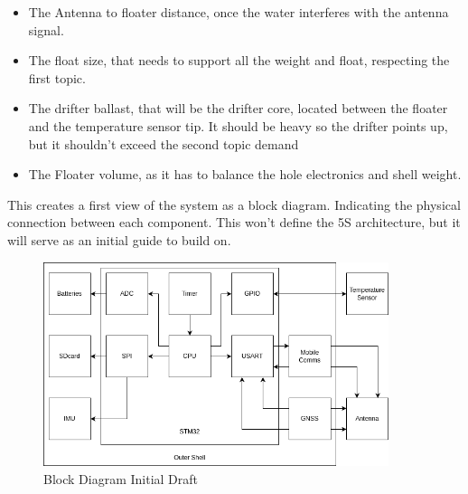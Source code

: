 \begin{itemize}
    \item The Antenna to floater distance, once the water interferes with the antenna signal.
    \item The float size, that needs to support all the weight and float, respecting the first topic.
    \item The drifter ballast, that will be the drifter core, located between the 
    floater and the temperature sensor tip. It should be heavy so the drifter points up, but it shouldn't exceed the 
    second topic demand 
    \item The Floater volume, as it has to balance the hole electronics and shell 
    weight.
\end{itemize}
This creates a first view of the system as a block diagram. Indicating the physical 
connection between each component. This won't define the 5S architecture, but it will serve
as an initial guide to build on.

\begin{figure}[H]
    \centering
    \includegraphics[width=0.9\textwidth]{images/diagrams/block_diagram/block_diagrams_3/blockdiagram_analysis.drawio.png}  %
    \caption{Block Diagram Initial Draft}
    \label{fig:Block Diagram Initial Draft}        
\end{figure}

